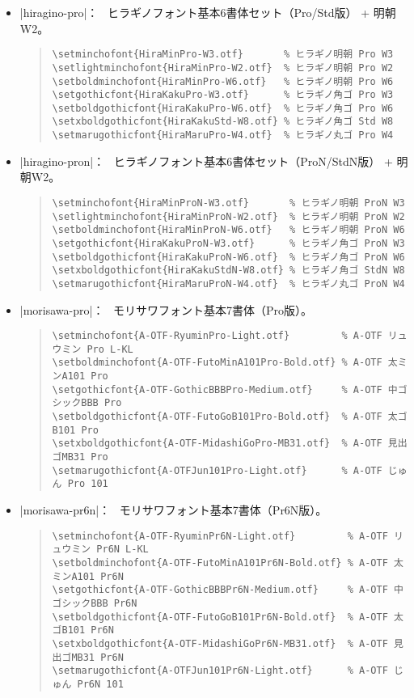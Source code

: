 \documentclass[a4paper,uplatex]{jsarticle}
\newcommand{\Means}{：\ }
\begin{document}
\begin{itemize}
\item |hiragino-pro|\Means
  ヒラギノフォント基本6書体セット（Pro/Std版） + 明朝W2。
\begin{quote}\small\begin{verbatim}
\setminchofont{HiraMinPro-W3.otf}       % ヒラギノ明朝 Pro W3
\setlightminchofont{HiraMinPro-W2.otf}  % ヒラギノ明朝 Pro W2
\setboldminchofont{HiraMinPro-W6.otf}   % ヒラギノ明朝 Pro W6
\setgothicfont{HiraKakuPro-W3.otf}      % ヒラギノ角ゴ Pro W3
\setboldgothicfont{HiraKakuPro-W6.otf}  % ヒラギノ角ゴ Pro W6
\setxboldgothicfont{HiraKakuStd-W8.otf} % ヒラギノ角ゴ Std W8
\setmarugothicfont{HiraMaruPro-W4.otf}  % ヒラギノ丸ゴ Pro W4
\end{verbatim}\end{quote}

\item |hiragino-pron|\Means
  ヒラギノフォント基本6書体セット（ProN/StdN版） + 明朝W2。
\begin{quote}\small\begin{verbatim}
\setminchofont{HiraMinProN-W3.otf}       % ヒラギノ明朝 ProN W3
\setlightminchofont{HiraMinProN-W2.otf}  % ヒラギノ明朝 ProN W2
\setboldminchofont{HiraMinProN-W6.otf}   % ヒラギノ明朝 ProN W6
\setgothicfont{HiraKakuProN-W3.otf}      % ヒラギノ角ゴ ProN W3
\setboldgothicfont{HiraKakuProN-W6.otf}  % ヒラギノ角ゴ ProN W6
\setxboldgothicfont{HiraKakuStdN-W8.otf} % ヒラギノ角ゴ StdN W8
\setmarugothicfont{HiraMaruProN-W4.otf}  % ヒラギノ丸ゴ ProN W4
\end{verbatim}\end{quote}

\item |morisawa-pro|\Means
  モリサワフォント基本7書体（Pro版）。
\begin{quote}\small\begin{verbatim}
\setminchofont{A-OTF-RyuminPro-Light.otf}         % A-OTF リュウミン Pro L-KL
\setboldminchofont{A-OTF-FutoMinA101Pro-Bold.otf} % A-OTF 太ミンA101 Pro
\setgothicfont{A-OTF-GothicBBBPro-Medium.otf}     % A-OTF 中ゴシックBBB Pro
\setboldgothicfont{A-OTF-FutoGoB101Pro-Bold.otf}  % A-OTF 太ゴB101 Pro
\setxboldgothicfont{A-OTF-MidashiGoPro-MB31.otf}  % A-OTF 見出ゴMB31 Pro
\setmarugothicfont{A-OTFJun101Pro-Light.otf}      % A-OTF じゅん Pro 101
\end{verbatim}\end{quote}

\item |morisawa-pr6n|\Means
  モリサワフォント基本7書体（Pr6N版）。
\begin{quote}\small\begin{verbatim}
\setminchofont{A-OTF-RyuminPr6N-Light.otf}         % A-OTF リュウミン Pr6N L-KL
\setboldminchofont{A-OTF-FutoMinA101Pr6N-Bold.otf} % A-OTF 太ミンA101 Pr6N
\setgothicfont{A-OTF-GothicBBBPr6N-Medium.otf}     % A-OTF 中ゴシックBBB Pr6N
\setboldgothicfont{A-OTF-FutoGoB101Pr6N-Bold.otf}  % A-OTF 太ゴB101 Pr6N
\setxboldgothicfont{A-OTF-MidashiGoPr6N-MB31.otf}  % A-OTF 見出ゴMB31 Pr6N
\setmarugothicfont{A-OTFJun101Pr6N-Light.otf}      % A-OTF じゅん Pr6N 101
\end{verbatim}\end{quote}
\end{itemize}
\end{document}

